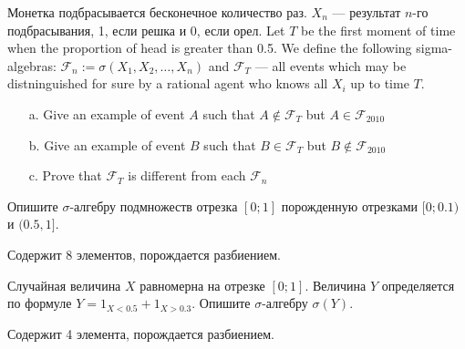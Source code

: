 \begin{problem}
Монетка подбрасывается бесконечное количество раз. $ X_{n} $ — результат $ n $-го подбрасывания, 1, если решка и 0, если орел. Let $T$ be the first moment of time when the proportion of head is greater than 0.5. We define the following sigma-algebras: $ \mathcal{F}_{n}:=\sigma(X_{1},X_{2},\ldots,X_{n})$ and $ \mathcal{F}_{T} $ — all events which may be distninguished for sure by a rational agent who knows all $ X_{i} $ up to time $ T $.
\begin{itemize}
\item[a.] Give an example of event $A$ such that $ A\notin \mathcal{F}_{T} $ but $ A\in \mathcal{F}_{2010} $
\item[b.] Give an example of event $B$ such that $ B\in \mathcal{F}_{T} $ but $ B\notin \mathcal{F}_{2010} $
\item[c.] Prove that $ \mathcal{F}_{T} $ is different from each $ \mathcal{F}_{n} $
\end{itemize}


\begin{sol}

\end{sol}
\end{problem}

\begin{problem}
Опишите $\sigma$-алгебру подмножеств отрезка $[0;1]$ порожденную отрезками $[0;0.1)$ и $(0.5,1]$.

\begin{sol}
Содержит 8 элементов, порождается разбиением.
\end{sol}
\end{problem}

\begin{problem}
Случайная величина $X$ равномерна на отрезке $[0;1]$. Величина $Y$ определяется по формуле $Y=1_{X<0.5}+1_{X>0.3}$. Опишите $\sigma$-алгебру $\sigma(Y)$.

\begin{sol}
Содержит 4 элемента, порождается разбиением.
\end{sol}
\end{problem}


